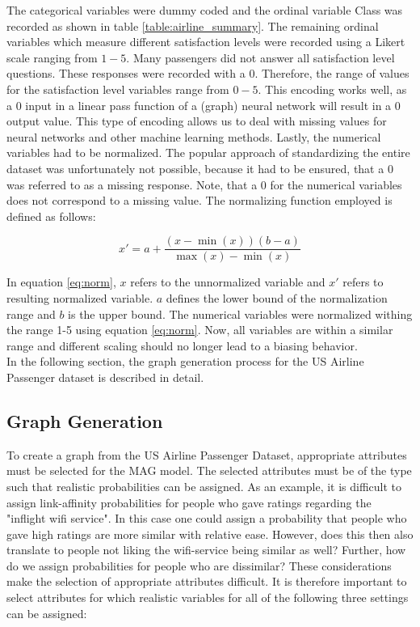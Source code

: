   \noindent The categorical variables were dummy coded and the ordinal variable
  Class was recorded as shown in table \ref{table:airline_summary}. The
  remaining ordinal variables which measure different satisfaction levels were
  recorded using a Likert scale ranging from $1 - 5$. Many passengers did not
  answer all satisfaction level questions. These responses were recorded
  with a 0. Therefore, the range of values for the satisfaction level variables
  range from $0 - 5$. This encoding works well, as a 0 input in a linear pass
  function of a (graph) neural network will result in a 0 output value. This
  type of encoding allows us to deal with missing values for neural networks
  and other machine learning methods. Lastly, the numerical variables had to be
  normalized. The popular approach of standardizing the entire dataset was 
  unfortunately not possible, because it had to be ensured, that a 0 was 
  referred to as a missing response. Note, that a 0 for the numerical variables 
  does not correspond to a missing value. The normalizing function employed is
  defined as follows:

  \begin{equation}
    x' = a + \frac{(x - \min(x))(b - a)}{\max(x) - \min(x)}
    \label{eq:norm}
  \end{equation}

  \noindent In equation \ref{eq:norm}, $x$ refers to the unnormalized 
  variable and $x'$ refers to resulting normalized variable. $a$ defines 
  the lower bound of the normalization range and $b$ is the upper bound. The
  numerical variables were normalized withing the range 1-5 using equation
  \ref{eq:norm}. Now, all variables are within a similar range and different 
  scaling should no longer lead to a biasing behavior. \\

  \noindent In the following section, the graph generation process for the US
  Airline Passenger dataset is described in detail.

  \subsection{Graph Generation}
  \label{section:graph_gen}

  To create a graph from the US Airline Passenger Dataset, appropriate
  attributes must be selected for the MAG model. The selected attributes must be
  of the type such that realistic probabilities can be assigned. As an example, 
  it is difficult to assign link-affinity probabilities for people who gave 
  ratings regarding the "inflight wifi service". In this case one could assign 
  a probability that people who gave high ratings are more similar with 
  relative ease. However, does this then also translate to people not liking 
  the wifi-service being similar as well? Further, how do we assign 
  probabilities for people who are dissimilar? These considerations make the 
  selection of appropriate attributes difficult. It is therefore important to 
  select attributes for which realistic variables for all of the following
  three settings can be assigned:

